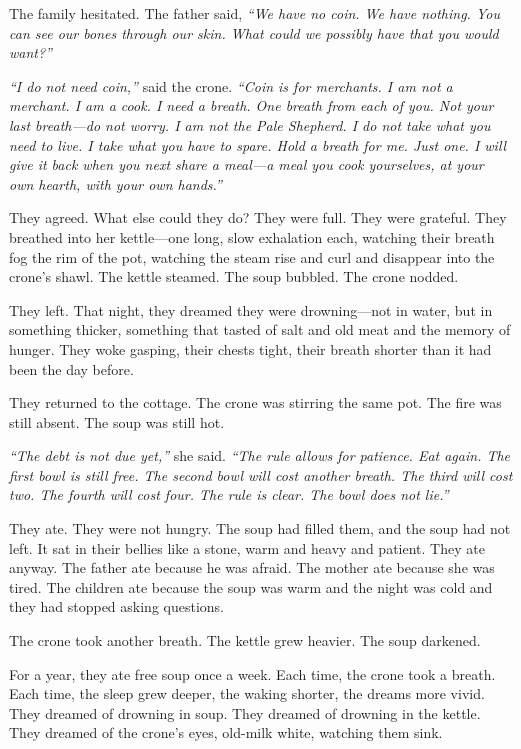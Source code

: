 The family hesitated. The father said, \textit{``We have no coin. We have nothing. You can see our bones through our skin. What could we possibly have that you would want?''}

\textit{``I do not need coin,''} said the crone. \textit{``Coin is for merchants. I am not a merchant. I am a cook. I need a breath. One breath from each of you. Not your last breath---do not worry. I am not the Pale Shepherd. I do not take what you need to live. I take what you have to spare. Hold a breath for me. Just one. I will give it back when you next share a meal---a meal you cook yourselves, at your own hearth, with your own hands.''}

They agreed. What else could they do? They were full. They were grateful. They breathed into her kettle---one long, slow exhalation each, watching their breath fog the rim of the pot, watching the steam rise and curl and disappear into the crone's shawl. The kettle steamed. The soup bubbled. The crone nodded.

They left. That night, they dreamed they were drowning---not in water, but in something thicker, something that tasted of salt and old meat and the memory of hunger. They woke gasping, their chests tight, their breath shorter than it had been the day before.

They returned to the cottage. The crone was stirring the same pot. The fire was still absent. The soup was still hot.

\textit{``The debt is not due yet,''} she said. \textit{``The rule allows for patience. Eat again. The first bowl is still free. The second bowl will cost another breath. The third will cost two. The fourth will cost four. The rule is clear. The bowl does not lie.''}

They ate. They were not hungry. The soup had filled them, and the soup had not left. It sat in their bellies like a stone, warm and heavy and patient. They ate anyway. The father ate because he was afraid. The mother ate because she was tired. The children ate because the soup was warm and the night was cold and they had stopped asking questions.

The crone took another breath. The kettle grew heavier. The soup darkened.

For a year, they ate free soup once a week. Each time, the crone took a breath. Each time, the sleep grew deeper, the waking shorter, the dreams more vivid. They dreamed of drowning in soup. They dreamed of drowning in the kettle. They dreamed of the crone's eyes, old-milk white, watching them sink.

